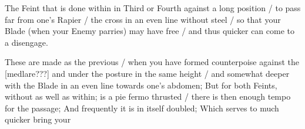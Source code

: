 The Feint that is done within in Third or Fourth against a long
position / to pass far from one's Rapier / the cross in an even line
without steel / so that your Blade (when your Enemy parries) may have
free / and thus quicker can come to a disengage.


These are made as the previous / when you have formed counterpoise
against the [medlare???] and under the posture in the
same height / and somewhat deeper with the Blade in an even line
towards one's abdomen; But for both Feints,
without as well as within; is a pie fermo thrusted / there is
then enough tempo for the passage; And frequently it is in itself
doubled; Which serves to much quicker bring your
